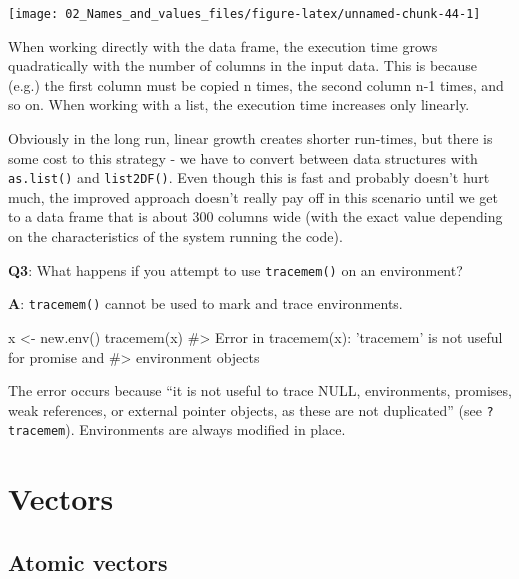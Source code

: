 \documentclass[
]{krantz}
\makeatletter
\newenvironment{Shaded}{\begin{snugshade}}{\end{snugshade}}
\newcommand{\CommentTok}[1]{\textcolor[rgb]{0.56,0.35,0.01}{\textit{#1}}}
\newcommand{\KeywordTok}[1]{\textcolor[rgb]{0.13,0.29,0.53}{\textbf{#1}}}
\newcommand{\NormalTok}[1]{#1}
\newcommand{\StringTok}[1]{\textcolor[rgb]{0.31,0.60,0.02}{#1}}
\newenvironment{kframe}{%
\medskip{}
\setlength{\fboxsep}{.8em}
 \def\at@end@of@kframe{}%
 \ifinner\ifhmode%
  \def\at@end@of@kframe{\end{minipage}}%
  \begin{minipage}{\columnwidth}%
 \fi\fi%
 \def\FrameCommand##1{\hskip\@totalleftmargin \hskip-\fboxsep
 \colorbox{shadecolor}{##1}\hskip-\fboxsep
     \hskip-\linewidth \hskip-\@totalleftmargin \hskip\columnwidth}%
 \MakeFramed {\advance\hsize-\width
   \@totalleftmargin\z@ \linewidth\hsize
   \@setminipage}}%
 {\par\unskip\endMakeFramed%
 \at@end@of@kframe}
\renewenvironment{Shaded}{\begin{kframe}}{\end{kframe}}
\renewcommand{\KeywordTok} [1]{\textcolor[rgb]{0.00,0.44,0.13}{{#1}}}
\renewcommand{\StringTok}  [1]{\textcolor[rgb]{0.25,0.44,0.63}{{#1}}}
\renewcommand{\CommentTok} [1]{\textcolor[rgb]{0.38,0.63,0.69}{{#1}}}
\renewcommand{\NormalTok}  [1]{{#1}}
\makeatother
\begin{document}
\begin{center}\texttt{[image: 02\_Names\_and\_values\_files/figure-latex/unnamed-chunk-44-1]} \end{center}

When working directly with the data frame, the execution time grows quadratically with the number of columns in the input data. This is because (e.g.) the first column must be copied n times, the second column n-1 times, and so on. When working with a list, the execution time increases only linearly.

Obviously in the long run, linear growth creates shorter run-times, but there is some cost to this strategy - we have to convert between data structures with \texttt{as.list()} and \texttt{list2DF()}. Even though this is fast and probably doesn't hurt much, the improved approach doesn't really pay off in this scenario until we get to a data frame that is about 300 columns wide (with the exact value depending on the characteristics of the system running the code).

\textbf{{Q3}}: What happens if you attempt to use \texttt{tracemem()} on an environment?

\textbf{{A}}: \texttt{tracemem()} cannot be used to mark and trace environments.

\begin{Shaded}
\begin{Highlighting}[]
\NormalTok{x <-}\StringTok{ }\KeywordTok{new.env}\NormalTok{()}
\KeywordTok{tracemem}\NormalTok{(x)}
\CommentTok{#> Error in tracemem(x): 'tracemem' is not useful for promise and}
\CommentTok{#> environment objects}
\end{Highlighting}
\end{Shaded}

The error occurs because ``it is not useful to trace NULL, environments, promises, weak references, or external pointer objects, as these are not duplicated'' (see \texttt{?tracemem}). Environments are always modified in place.

\hypertarget{vectors}{%
\chapter{Vectors}\label{vectors}}


\hypertarget{atomic-vectors}{%
\section{Atomic vectors}\label{atomic-vectors}}
\end{document}
